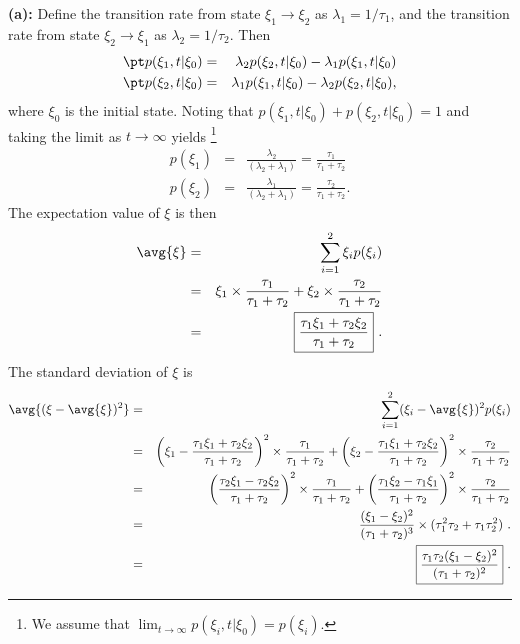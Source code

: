 
\textbf{(a):} Define the transition rate from state $\xi_1 \rightarrow \xi_2$ as $\lambda_1=1/\tau_1$, and the transition rate from state $\xi_2 \rightarrow \xi_1$ as $\lambda_2=1/\tau_2$. Then
\begin{eqnarray}
\pt p(\xi_1, t|\xi_0) &=& \lambda_2 p(\xi_2, t|\xi_0) - \lambda_1 p(\xi_1, t|\xi_0) \nonumber \\
\pt p(\xi_2, t|\xi_0) &=& \lambda_1 p(\xi_1, t|\xi_0) - \lambda_2 p(\xi_2, t|\xi_0), \nonumber
\end{eqnarray}
where $\xi_0$ is the initial state. Noting that $p(\xi_1, t| \xi_0) + p(\xi_2, t| \xi_0) = 1$ and taking the limit as $t\rightarrow \infty$ yields \footnote{We assume that $\lim_{t\rightarrow \infty} p(\xi_i, t|\xi_0) = p(\xi_i)$.}
\begin{eqnarray}
p(\xi_1) &=& \frac{\lambda_2}{(\lambda_2 + \lambda_1)} = \frac{\tau_1}{\tau_1 + \tau_2} \nonumber \\
p(\xi_2) &=& \frac{\lambda_1}{(\lambda_2 + \lambda_1)} = \frac{\tau_2}{\tau_1 + \tau_2}. \nonumber
\end{eqnarray}
The expectation value of $\xi$ is then
\begin{eqnarray}
\avg{\xi} &=& \sum_{i=1}^{2} \xi_i p(\xi_i) \nonumber \\
&=& \xi_1 \times \frac{\tau_1}{\tau_1 + \tau_2} + \xi_2 \times \frac{\tau_2}{\tau_1 + \tau_2} \nonumber \\
&=& \boxed{\frac{\tau_1 \xi_1 + \tau_2 \xi_2}{\tau_1 + \tau_2}}~. \nonumber
\end{eqnarray}
The standard deviation of $\xi$ is
\begin{eqnarray}
\avg{(\xi-\avg{\xi})^2} &=& \sum_{i=1}^{2} (\xi_i - \avg{\xi})^2 p(\xi_i) \nonumber \\ 
&=& \bigg(\xi_1 - \frac{\tau_1 \xi_1 + \tau_2 \xi_2}{\tau_1 + \tau_2}\bigg)^2 \times \frac{\tau_1}{\tau_1 + \tau_2} + \bigg(\xi_2 - \frac{\tau_1 \xi_1 + \tau_2 \xi_2}{\tau_1 + \tau_2}\bigg)^2 \times \frac{\tau_2}{\tau_1 + \tau_2} \nonumber \\
&=& \bigg(\frac{\tau_2 \xi_1 - \tau_2 \xi_2}{\tau_1 + \tau_2}\bigg)^2 \times \frac{\tau_1}{\tau_1 + \tau_2} + \bigg(\frac{\tau_1 \xi_2 - \tau_1 \xi_1}{\tau_1 + \tau_2}\bigg)^2 \times \frac{\tau_2}{\tau_1 + \tau_2} \nonumber \\
&=& \frac{(\xi_1-\xi_2)^2}{(\tau_1 + \tau_2)^3} \times ( \tau_1^2 \tau_2 + \tau_1 \tau_2^2)~. \nonumber \\
&=& \boxed{\frac{\tau_1 \tau_2 (\xi_1-\xi_2)^2}{(\tau_1 + \tau_2)^2}} ~. \nonumber \\
\end{eqnarray}

